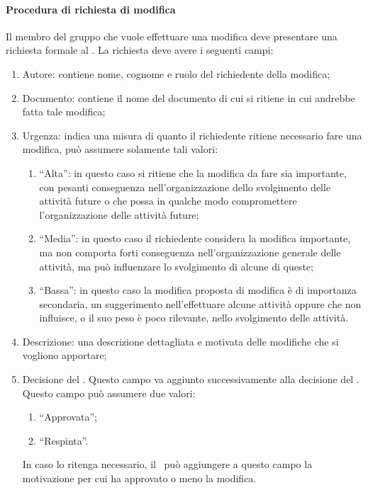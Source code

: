 \documentclass[../NormeProgetto.tex]{subfiles}
\begin{document}
	\paragraph{Procedura di richiesta di modifica}
		Il membro del gruppo che vuole effettuare una modifica deve presentare una richiesta formale al \responsabilediprogetto. La richiesta deve avere i seguenti campi:
		\begin{enumerate}
			\item Autore: contiene nome, cognome e ruolo del richiedente della modifica;
			\item Documento: contiene il nome del documento di cui si ritiene in cui andrebbe fatta tale modifica;
			\item Urgenza: indica una misura di quanto il richiedente ritiene necessario fare una modifica, può assumere solamente tali valori:
				\begin{enumerate}
					\item ``Alta'': in questo caso si ritiene che la modifica da fare sia importante, con pesanti conseguenza nell'organizzazione dello svolgimento delle attività future o che possa in qualche modo compromettere l'organizzazione delle attività future;
					\item ``Media'': in questo caso il richiedente considera la modifica importante, ma non comporta forti conseguenza nell'organizzazione generale delle attività, ma può influenzare lo svolgimento di alcune di queste;
					\item ``Bassa'': in questo caso la modifica proposta di modifica è di importanza secondaria, un suggerimento nell'effettuare alcune attività oppure che non influisce, o il suo peso è poco rilevante, nello svolgimento delle attività.
				\end{enumerate}
			\item Descrizione: una descrizione dettagliata e motivata delle modifiche che si vogliono apportare;
			\item Decisione del \responsabilediprogetto. Questo campo va aggiunto successivamente alla decisione del \responsabilediprogetto. Questo campo può assumere due valori:
				\begin{enumerate}
					\item ``Approvata'';
					\item ``Respinta''.
				\end{enumerate}
			In caso lo ritenga necessario, il \responsabilediprogetto\ può aggiungere a questo campo la motivazione per cui ha approvato o meno la modifica.
		\end{enumerate}
\end{document}
